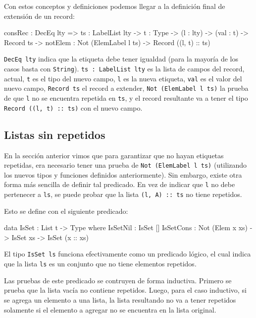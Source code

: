 Con estos conceptos y definiciones podemos llegar a la definición final de extensión de un record:

\begin{code}
consRec : DecEq lty => {ts : LabelList lty} ->
  {t : Type} -> (l : lty) -> (val : t) ->
  Record ts -> {notElem : Not (ElemLabel l ts)} ->
  Record ((l, t) :: ts)
\end{code}

\texttt{DecEq lty} indica que la etiqueta debe tener igualdad (para la mayoría de los casos basta con \texttt{String}). \texttt{ts : LabelList lty} es la lista de campos del record, actual, \texttt{t} es el tipo del nuevo campo, \texttt{l} es la nueva etiqueta, \texttt{val} es el valor del nuevo campo, \texttt{Record ts} el record a extender, \texttt{Not (ElemLabel l ts)} la prueba de que \texttt{l} no se encuentra repetida en \texttt{ts}, y el record resultante va a tener el tipo \texttt{Record ((l, t) :: ts)} con el nuevo campo.

\subsection{Listas sin repetidos}

En la sección anterior vimos que para garantizar que no hayan etiquetas repetidas, era necesario tener una prueba de \texttt{Not (ElemLabel l ts)} (utilizando los nuevos tipos y funciones definidos anteriormente). Sin embargo, existe otra forma más sencilla de definir tal predicado. En vez de indicar que \texttt{l} no debe pertenecer a \texttt{ls}, se puede probar que la lista \texttt{(l, A) :: ts} no tiene repetidos.

Esto se define con el siguiente predicado:

\begin{code}
data IsSet : List t -> Type where
  IsSetNil : IsSet []
  IsSetCons : Not (Elem x xs) -> IsSet xs ->
    IsSet (x :: xs)
\end{code}

El tipo \texttt{IsSet ls} funciona efectivamente como un predicado lógico, el cual indica que la lista \texttt{ls} es un conjunto que no tiene elementos repetidos.

Las pruebas de este predicado se contruyen de forma inductiva. Primero se prueba que la lista vacía no contiene repetidos. Luego, para el caso inductivo, si se agrega un elemento a una lista, la lista resultando no va a tener repetidos solamente si el elemento a agregar no se encuentra en la lista original.


